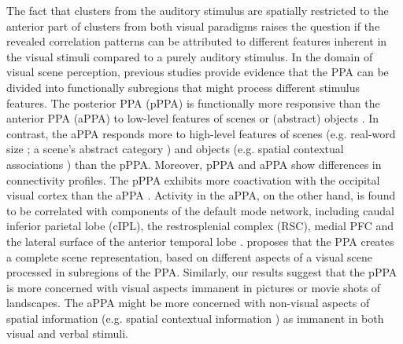\documentclass[english]{article}
\begin{document}
The fact that clusters from the auditory stimulus are spatially restricted to
the anterior part of clusters from both visual paradigms raises the question if
the revealed correlation patterns can be attributed to different features
inherent in the visual stimuli compared to a purely auditory stimulus.
In the domain of visual scene perception, previous studies provide evidence
that the PPA can be divided into functionally subregions that might process
different stimulus features.
The posterior PPA (pPPA) is functionally more responsive than the anterior PPA
(aPPA) to low-level features of scenes or (abstract) objects
\citep{baldassano2013differential, nasr2014thinking,
rajimehr2011parahippocampal}.
In contrast, the aPPA responds more to high-level features of scenes (e.g.
real-word size \citep{park2015parametric}; a scene's abstract category
\citep{marchette2015outside, watson2016patterns}) and objects (e.g. spatial
contextual associations \citep{aminoff2007parahippocampal, aminoff2013role})
than the pPPA.
Moreover, pPPA and aPPA show differences in connectivity profiles.
The pPPA exhibits more coactivation with the occipital visual cortex than the
aPPA \citep{baldassano2013differential, baldassano2016two}.
Activity in the aPPA, on the other hand, is found to be correlated with
components of the default mode network, including caudal inferior parietal lobe
(cIPL), the restrosplenial complex (RSC), medial PFC and the lateral surface of
the anterior temporal lobe \citep{baldassano2013differential,
baldassano2016two}.
\cite{baldassano2013differential} proposes that the PPA creates a complete
scene representation, based on different aspects of a visual scene processed in
subregions of the PPA.
Similarly, our results suggest that the pPPA is more concerned with visual
aspects immanent in pictures or movie shots of landscapes.
The aPPA might be more concerned with non-visual aspects of spatial information
(e.g. spatial contextual information \citep{aminoff2007parahippocampal}) as
immanent in both visual and verbal stimuli.
\end{document}
